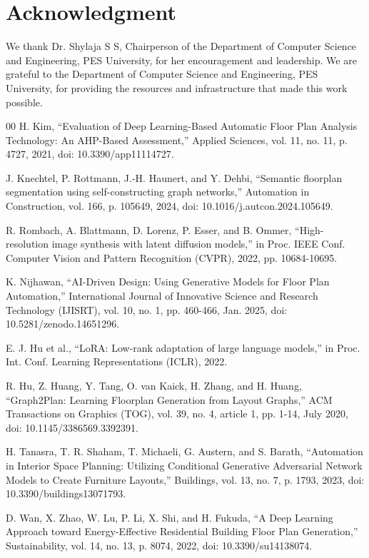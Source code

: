 \documentclass[10pt,conference]{IEEEtran}
\begin{document}
\section*{Acknowledgment}

 We thank Dr. Shylaja S S, Chairperson of the Department of Computer Science and Engineering, PES University, for her encouragement and leadership. We are grateful to the Department of Computer Science and Engineering, PES University, for providing the resources and infrastructure that made this work possible. 

\begin{thebibliography}{00}
 H. Kim, ``Evaluation of Deep Learning-Based Automatic Floor Plan Analysis Technology: An AHP-Based Assessment,'' Applied Sciences, vol. 11, no. 11, p. 4727, 2021, doi: 10.3390/app11114727.

 J. Knechtel, P. Rottmann, J.-H. Haunert, and Y. Dehbi, ``Semantic floorplan segmentation using self-constructing graph networks,'' Automation in Construction, vol. 166, p. 105649, 2024, doi: 10.1016/j.autcon.2024.105649.

 R. Rombach, A. Blattmann, D. Lorenz, P. Esser, and B. Ommer, ``High-resolution image synthesis with latent diffusion models,'' in Proc. IEEE Conf. Computer Vision and Pattern Recognition (CVPR), 2022, pp. 10684-10695.

 K. Nijhawan, ``AI-Driven Design: Using Generative Models for Floor Plan Automation,'' International Journal of Innovative Science and Research Technology (IJISRT), vol. 10, no. 1, pp. 460-466, Jan. 2025, doi: 10.5281/zenodo.14651296.

 E. J. Hu et al., ``LoRA: Low-rank adaptation of large language models,'' in Proc. Int. Conf. Learning Representations (ICLR), 2022.

 R. Hu, Z. Huang, Y. Tang, O. van Kaick, H. Zhang, and H. Huang, ``Graph2Plan: Learning Floorplan Generation from Layout Graphs,'' ACM Transactions on Graphics (TOG), vol. 39, no. 4, article 1, pp. 1-14, July 2020, doi: 10.1145/3386569.3392391.

 H. Tanasra, T. R. Shaham, T. Michaeli, G. Austern, and S. Barath, ``Automation in Interior Space Planning: Utilizing Conditional Generative Adversarial Network Models to Create Furniture Layouts,'' Buildings, vol. 13, no. 7, p. 1793, 2023, doi: 10.3390/buildings13071793.

 D. Wan, X. Zhao, W. Lu, P. Li, X. Shi, and H. Fukuda, ``A Deep Learning Approach toward Energy-Effective Residential Building Floor Plan Generation,'' Sustainability, vol. 14, no. 13, p. 8074, 2022, doi: 10.3390/su14138074.


\end{thebibliography}
\end{document}
